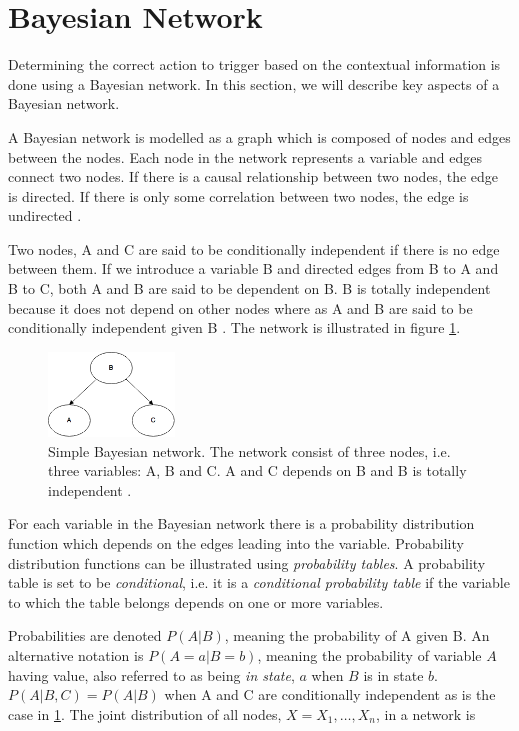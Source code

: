 \section{Bayesian Network}

Determining the correct action to trigger based on the contextual information is done using a Bayesian network. In this section, we will describe key aspects of a Bayesian network.

A Bayesian network is modelled as a graph which is composed of nodes and edges between the nodes. Each node in the network represents a variable and edges connect two nodes. If there is a causal relationship between two nodes, the edge is directed. If there is only some correlation between two nodes, the edge is undirected \cite{stephenson2000introduction}.

Two nodes, A and C are said to be conditionally independent if there is no edge between them. If we introduce a variable B and directed edges from B to A and B to C, both A and B are said to be dependent on B. B is totally independent because it does not depend on other nodes where as A and B are said to be conditionally independent given B \cite{stephenson2000introduction}. The network is illustrated in figure \cref{fig:analysis:bayesian-network:abc}.

\begin{figure}[h!]
\centering
\includegraphics[width=0.3\textwidth]{images/a_b_c_bayesian_network}
\caption{Simple Bayesian network. The network consist of three nodes, i.e. three variables: A, B and C. A and C depends on B and B is totally independent \cite{stephenson2000introduction}.}
\label{fig:analysis:bayesian-network:abc}
\end{figure}

For each variable in the Bayesian network there is a probability distribution function which depends on the edges leading into the variable. Probability distribution functions can be illustrated using \emph{probability tables}. A probability table is set to be \emph{conditional}, i.e. it is a \emph{conditional probability table} if the variable to which the table belongs depends on one or more variables.

Probabilities are denoted $P(A|B)$, meaning the probability of A given B. An alternative notation is $P(A=a|B=b)$, meaning the probability of variable $A$ having value, also referred to as being \emph{in state}, $a$ when $B$ is in state $b$. $P(A|B,C) = P(A|B)$ when A and C are conditionally independent as is the case in \cref{fig:analysis:bayesian-network:abc}. The joint distribution of all nodes, $X = X_1,\ldots,X_n$, in a network is 

